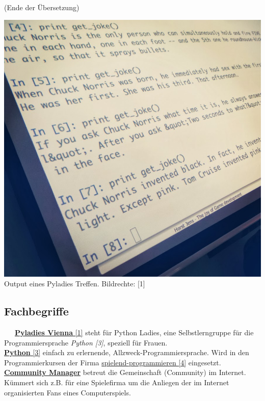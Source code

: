 (Ende der Übersetzung)
\begin{center}
\includegraphics[width=\linewidth]{floor/floor-jokes.jpg} \\
\footnotesize{Output eines Pyladies Treffen. Bildrechte: [1]} 
\end{center}
\subsection*{Fachbegriffe}

~~~\href{https://twitter.com/pyladies_vie}{\textbf{Pyladies Vienna} [1]} steht für Python Ladies, eine Selbstlerngruppe für die Programmiersprache  \textit{Python [3]}, speziell für Frauen. \\

\href{http://python.org}{\textbf{Python} [3]} einfach zu erlernende, Allzweck-Programmiersprache. Wird in den Programmierkursen der Firma \href{http://spielend-programmieren.at}{spielend-programmieren [4]} eingesetzt. \\

\href{http://de.wikipedia.org/wiki/Community_Management}{\textbf{Community Manager}} betreut die Gemeinschaft (Community) im Internet. Kümmert sich z.B. für eine Spielefirma um die Anliegen der im Internet organisierten Fans eines Computerspiels. \\

